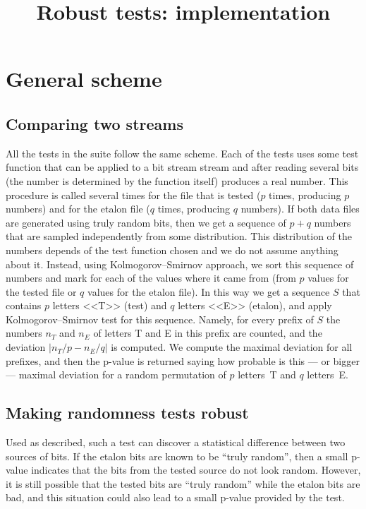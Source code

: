 \documentclass[12pt,a4paper,fullpage]{article}
\begin{document}
\title{Robust tests: implementation}
\author{}
\date{}
\maketitle


\section{General scheme}

\subsection{Comparing two streams}

All the tests in the suite follow the same scheme. Each of the tests uses some test function that can be applied to a bit stream stream and after reading several bits (the number is determined by the function itself) produces a real number. This procedure is called several times for the file that is tested ($p$ times, producing $p$ numbers) and for the etalon file ($q$ times, producing $q$ numbers). If both data files are generated using truly random bits, then we get a sequence of $p+q$ numbers that are sampled independently from some distribution. This distribution of the numbers depends of the test function chosen and we do not assume anything about it. Instead, using Kolmogorov--Smirnov approach, we sort this sequence of numbers and mark for each of the values where it came from (from $p$ values for the tested file or $q$ values for the etalon file). In this way we get a sequence $S$ that contains $p$ letters <<T>> (test) and $q$ letters <<E>> (etalon), and apply Kolmogorov--Smirnov test for this sequence. Namely, for every prefix of $S$ the numbers $n_T$ and $n_E$ of letters T and E in this prefix are counted, and the deviation $|n_T/p - n_E/q|$ is computed.  We compute the maximal deviation for all prefixes, and then the p-value is returned saying how probable is this --- or bigger --- maximal deviation for a random permutation of $p$ letters~T and $q$ letters~E.

\subsection{Making randomness tests robust}

Used as described, such a test can discover a statistical difference between two sources of bits. If the etalon bits are known to be ``truly random'', then a small p-value indicates that the bits from the tested source do not look random. However, it is still possible that the tested bits are ``truly random'' while the etalon bits are bad, and this situation could also lead to a small p-value provided by the test. 
\end{document}
